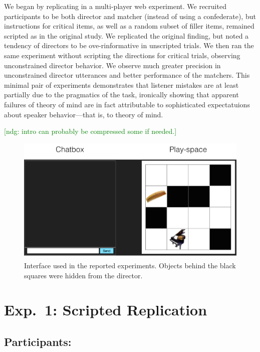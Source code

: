 \documentclass[10pt,letterpaper]{article}
\newcommand{\ndg}[1]{\textcolor{Green}{[ndg: #1]}}
\begin{document}
We began by replicating  in a multi-player web experiment. We recruited participants to be both director and matcher (instead of using a confederate), but instructions for critical items, as well as a random subset of filler items, remained scripted as in the original study. We replicated the original finding, but noted a tendency of directors to be ove-rinformative in unscripted trials. We then ran the same experiment without scripting the directions for critical trials, observing unconstrained director behavior. We observe much greater precision in unconstrained director utterances and better performance of the matchers. This minimal pair of experiments demonstrates that listener mistakes are at least partially due to the pragmatics of the task, ironically showing that apparent failures of theory of mind are in fact attributable to sophisticated expectatuions about speaker behavior---that is, to theory of mind.

\ndg{intro can probably be compressed some if needed.}

\begin{figure}
\begin{center}
\includegraphics[scale = .35]{images/overall_view.jpg}
\end{center}
\vspace{-.25cm}
\caption{Interface used in the reported experiments. Objects behind the black squares were hidden from the director.}
\label{fig:interface}
\end{figure}

\section{Exp.~1: Scripted Replication}
\label{sec:Exp1}

\subsection{Participants:}
\end{document}
